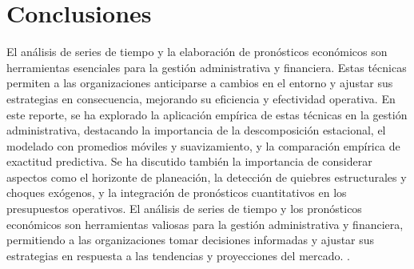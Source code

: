 {\clearpage
\section{Conclusiones}
El análisis de series de tiempo y la elaboración de pronósticos económicos son herramientas esenciales para la gestión administrativa y financiera. Estas técnicas permiten a las organizaciones anticiparse a cambios en el entorno y ajustar sus estrategias en consecuencia, mejorando su eficiencia y efectividad operativa. En este reporte, se ha explorado la aplicación empírica de estas técnicas en la gestión administrativa, destacando la importancia de la descomposición estacional, el modelado con promedios móviles y suavizamiento, y la comparación empírica de exactitud predictiva. Se ha discutido también la importancia de considerar aspectos como el horizonte de planeación, la detección de quiebres estructurales y choques exógenos, y la integración de pronósticos cuantitativos en los presupuestos operativos. El análisis de series de tiempo y los pronósticos económicos son herramientas valiosas para la gestión administrativa y financiera, permitiendo a las organizaciones tomar decisiones informadas y ajustar sus estrategias en respuesta a las tendencias y proyecciones del mercado. \citep{anderson2012,lind2012,wackerly2010,diazRodriguez2022}.
}

